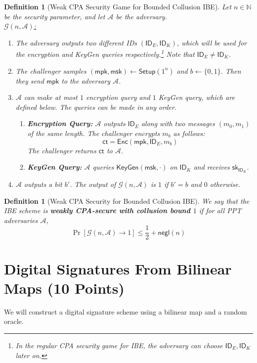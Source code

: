 \documentclass[11pt]{article}
\newtheorem{definition}[theorem]{Definition}
\numberwithin{equation}{section}
\newcommand{\enc}{\mathsf{Enc}}
\newcommand{\setup}{\mathsf{Setup}}
\newcommand{\keygen}{\mathsf{KeyGen}}
\newcommand{\mpk}{\mathsf{mpk}}
\newcommand{\msk}{\mathsf{msk}}
\newcommand{\sk}{\mathsf{sk}}
\newcommand{\id}{\mathsf{ID}}
\newcommand{\ct}{\mathsf{ct}}
\newcommand{\A}{\mathcal{A}}
\newcommand{\G}{\mathcal{G}}
\newcommand{\negl}{\mathsf{negl}}
\newcommand{\bin}{\{0,1\}}
\newcommand{\bit}{\bin}
\begin{document}
\begin{definition}[Weak CPA Security Game for Bounded Collusion IBE]
Let $n\in \mathbb{N}$ be the security parameter, and let $\A$ be the adversary.\\

\underline{$\G(n, \A)$:}
\begin{enumerate}
    \item The adversary outputs two different IDs $(\id_E, \id_K)$, which will be used for the encryption and KeyGen queries respectively.\footnote{In the regular CPA security game for IBE, the adversary can choose $\id_E, \id_K$ later on.} Note that $\id_E \neq \id_K$.
    \item The challenger samples $(\mpk, \msk) \leftarrow \setup(1^n)$ and $b \leftarrow \bit$. Then they send $\mpk$ to the adversary $\A$.
    \item $\A$ can make at most $1$ encryption query and $1$ KeyGen query, which are defined below. The queries can be made in any order.
    \begin{enumerate}
        \item \textbf{Encryption Query:} $\A$ outputs $\id_E$ along with two messages $(m_0, m_1)$ of the same length. The challenger encrypts $m_b$ as follows:
        \[\ct = \enc(\mpk, \id_E, m_b)\]
        The challenger returns $\ct$ to $\A$.\\
        \item \textbf{KeyGen Query:} $\A$ queries $\keygen(\msk, \cdot)$ on $\id_K$ and receives $\sk_{\id_K}$. 
    \end{enumerate}
    \item $\A$ outputs a bit $b'$. The output of $\G(n, \A)$ is $1$ if $b' = b$ and $0$ otherwise.
\end{enumerate}
\end{definition}

\begin{definition}[Weak CPA Security for Bounded Collusion IBE]
    We say that the IBE scheme is \textbf{weakly CPA-secure with collusion bound $1$} if for all PPT adversaries $\A$, 
    \[\Pr[\G(n, \A) \to 1] \leq \frac{1}{2} + \negl(n)\]
\end{definition}



\section{Digital Signatures From Bilinear Maps (10 Points)}
We will construct a digital signature scheme using a bilinear map and a random oracle.\\
\end{document}
